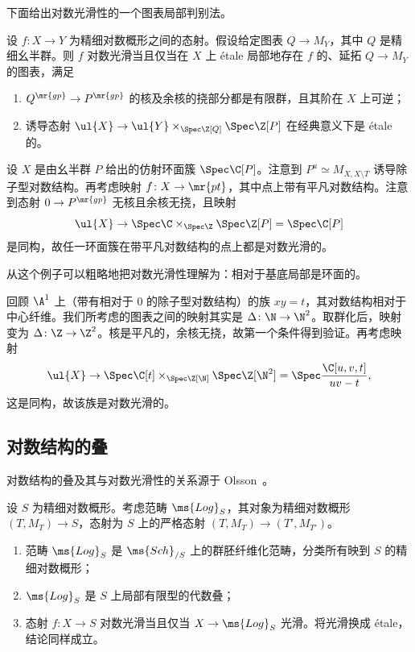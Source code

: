 下面给出对数光滑性的一个图表局部判别法。

\begin{thm}
    设 \(f \colon X \to Y\) 为精细对数概形之间的态射。假设给定图表 \(Q \to M_Y\)，其中 \(Q\) 是精细幺半群。则 \(f\) 对数光滑当且仅当在 \(X\) 上 \'etale 局部地存在 \(f\) 的、延拓 \(Q \to M_Y\) 的图表，满足
    \begin{enumerate}
        \item \(Q^{\mr{gp}} \to P^{\mr{gp}}\) 的核及余核的挠部分都是有限群，且其阶在 \(X\) 上可逆；
        \item 诱导态射 \(\ul{X} \to \ul{Y} \times_{\Spec \Z[Q]} \Spec \Z[P]\) 在经典意义下是 \'etale 的。
    \end{enumerate}
\end{thm}

\begin{exm}
    设 \(X\) 是由幺半群 \(P\) 给出的仿射环面簇 \(\Spec \C[P]\)。注意到 \(P^a \simeq M_{X, X \setminus T}\) 诱导除子型对数结构。再考虑映射 \(f \colon X \to \mr{pt}\)，其中点上带有平凡对数结构。注意到态射 \(0 \to P^{\mr{gp}}\) 无核且余核无挠，且映射
    \[ \ul{X} \to \Spec \C \times_{\Spec \Z} \Spec \Z[P] = \Spec \C[P] \]
    是同构，故任一环面簇在带平凡对数结构的点上都是对数光滑的。
\end{exm}

从这个例子可以粗略地把对数光滑性理解为：相对于基底局部是环面的。

\begin{exm}
    回顾 \(\A^1\) 上（带有相对于 \(0\) 的除子型对数结构）的族 \(xy = t\)，其对数结构相对于中心纤维。我们所考虑的图表之间的映射其实是 \(\Delta \colon \N \to \N^2\)。取群化后，映射变为 \(\Delta \colon \Z \to \Z^2\)。核是平凡的，余核无挠，故第一个条件得到验证。再考虑映射
    \[ \ul{X} \to \Spec \C[t] \times_{\Spec \Z[\N]} \Spec \Z[\N^2] = \Spec \frac{\C[u,v,t]}{uv-t}, \]
    这是同构，故该族是对数光滑的。
\end{exm}

\subsection{对数结构的叠}%
\label{sub:Stack of log structures}

对数结构的叠及其与对数光滑性的关系源于 Olsson~\cite{Olsson2003}。

设 \(S\) 为精细对数概形。考虑范畴 \(\ms{Log}_S\)，其对象为精细对数概形 \((T, M_T) \to S\)，态射为 \(S\) 上的严格态射 \((T, M_T) \to (T', M_{T'})\)。
\begin{enumerate}
    \item 范畴 \(\ms{Log}_S\) 是 \(\ms{Sch}_{/S}\) 上的群胚纤维化范畴，分类所有映到 \(S\) 的精细对数概形；
    \item \(\ms{Log}_S\) 是 \(S\) 上局部有限型的代数叠；
    \item 态射 \(f \colon X \to S\) 对数光滑当且仅当 \(X \to \ms{Log}_S\) 光滑。将光滑换成 \'etale，结论同样成立。
\end{enumerate}

